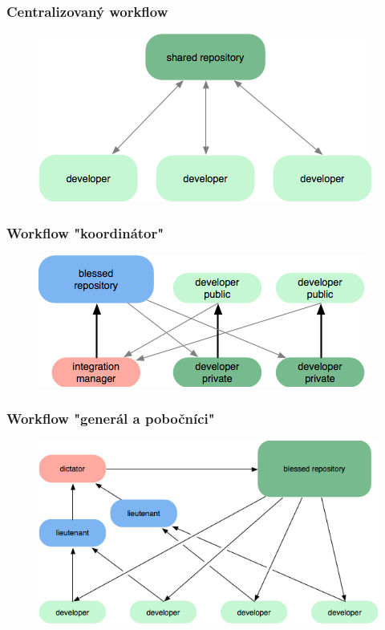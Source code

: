 \documentclass[red]{beamer}
\begin{document}
\begin{frame}
  \frametitle{Centralizovaný workflow}

  \begin{figure}
  \centering
  \includegraphics[scale=1]{git-pics/workflow-a.png}
\end{figure}
\end{frame}

\begin{frame}
  \frametitle{Workflow "koordinátor"}

  \begin{figure}
  \centering
  \includegraphics[scale=1]{git-pics/workflow-b.png}
\end{figure}
\end{frame}

\begin{frame}
  \frametitle{Workflow "generál a pobočníci"}

  \begin{figure}
  \centering
  \includegraphics[scale=1]{git-pics/workflow-c.png}
\end{figure}
\end{frame}
\end{document}
